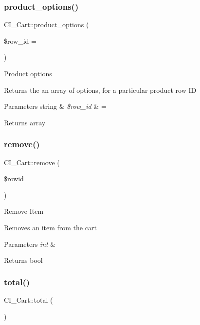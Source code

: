 \subsubsection{\texorpdfstring{product\+\_\+options()}{product\_options()}}
{\footnotesize\ttfamily C\+I\+\_\+\+Cart\+::product\+\_\+options (\begin{DoxyParamCaption}\item[{}]{\$row\+\_\+id = {\ttfamily \textquotesingle{}\textquotesingle{}} }\end{DoxyParamCaption})}

Product options

Returns the an array of options, for a particular product row ID


\begin{DoxyParams}[1]{Parameters}
string & {\em \$row\+\_\+id} & = \textquotesingle{}\textquotesingle{} \\
\hline
\end{DoxyParams}
\begin{DoxyReturn}{Returns}
array 
\end{DoxyReturn}
\mbox{\label{class_c_i___cart_a6dff875ea45702dc16faaa6ce76d2dec}} 
\subsubsection{\texorpdfstring{remove()}{remove()}}
{\footnotesize\ttfamily C\+I\+\_\+\+Cart\+::remove (\begin{DoxyParamCaption}\item[{}]{\$rowid }\end{DoxyParamCaption})}

Remove Item

Removes an item from the cart


\begin{DoxyParams}{Parameters}
{\em int} & \\
\hline
\end{DoxyParams}
\begin{DoxyReturn}{Returns}
bool 
\end{DoxyReturn}
\mbox{\label{class_c_i___cart_a56223f02085af765015279b8c644c20a}} 
\subsubsection{\texorpdfstring{total()}{total()}}
{\footnotesize\ttfamily C\+I\+\_\+\+Cart\+::total (\begin{DoxyParamCaption}{ }\end{DoxyParamCaption})}

